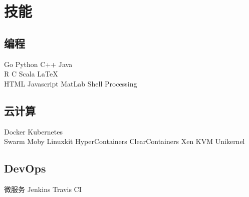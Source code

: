 \documentclass[]{deedy-resume-openfont}
\begin{document}
\begin{minipage}[t]{0.25\textwidth}

\section{技能}
\sectionsep
\subsection{编程}
Go \textbullet{} Python \textbullet{} C++ \textbullet{} Java \\
R \textbullet{} C \textbullet{} Scala \textbullet{} \LaTeX\ \\
HTML \textbullet{} Javascript \textbullet{} MatLab \textbullet{} Shell \textbullet{} Processing \\ 
\sectionsep

\subsection{云计算}
Docker \textbullet{} Kubernetes \\
Swarm \textbullet{} Moby \textbullet{} Linuxkit \textbullet{} HyperContainers \textbullet{} ClearContainers \textbullet{} Xen \textbullet{} KVM \textbullet{} Unikernel \\
\sectionsep

\subsection{DevOps}
微服务 \textbullet{} Jenkins \textbullet{} Travis CI

%
%

\end{minipage} 
\hfill
\end{document}
